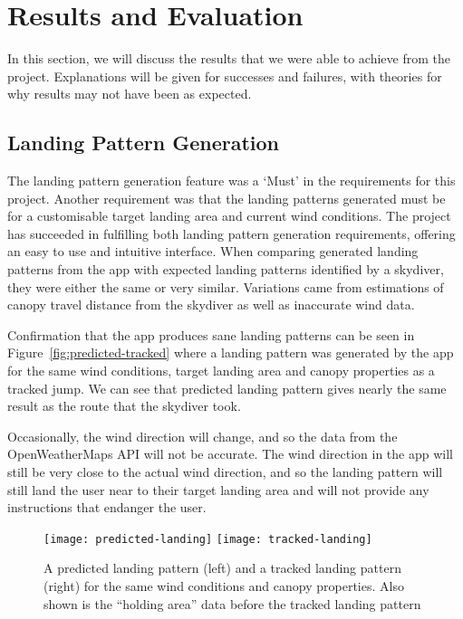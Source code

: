 \section{Results and Evaluation}\label{sec:results-and-evaluation}
In this section, we will discuss the results that we were able to achieve from the project. Explanations will be given for successes and failures, with theories for why results may not have been as expected.


\subsection{Landing Pattern Generation}
The landing pattern generation feature was a `Must' in the requirements for this project. Another requirement was that the landing patterns generated must be for a customisable target landing area and current wind conditions.
The project has succeeded in fulfilling both landing pattern generation requirements, offering an easy to use and intuitive interface.
When comparing generated landing patterns from the app with expected landing patterns identified by a skydiver, they were either the same or very similar. Variations came from estimations of canopy travel distance from the skydiver as well as inaccurate wind data.

Confirmation that the app produces sane landing patterns can be seen in Figure~\vref{fig:predicted-tracked} where a landing pattern was generated by the app for the same wind conditions, target landing area and canopy properties as a tracked jump. We can see that predicted landing pattern gives nearly the same result as the route that the skydiver took.

Occasionally, the wind direction will change, and so the data from the OpenWeatherMaps API will not be accurate. The wind direction in the app will still be very close to the actual wind direction, and so the landing pattern will still land the user near to their target landing area and will not provide any instructions that endanger the user.

\begin{figure}[ht]
  \centering
  \texttt{[image: predicted-landing]}
  \hspace{1cm}
  \texttt{[image: tracked-landing]}
  \caption{A predicted landing pattern (left) and a tracked landing pattern (right) for the same wind conditions and canopy properties. Also shown is the ``holding area'' data before the tracked landing pattern}\label{fig:predicted-tracked}
\end{figure}

